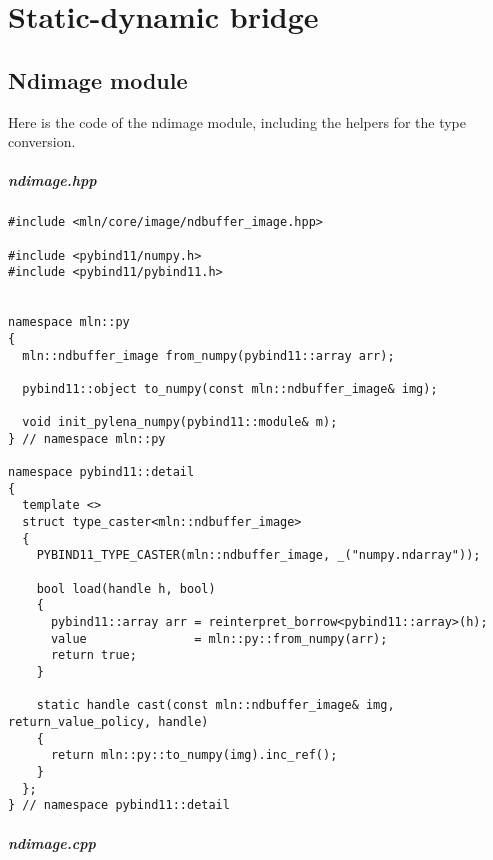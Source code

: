 \chapter{Static-dynamic bridge}
\label{appendix:static-dynamic-bridge}


\section{Ndimage module}
\label{appendix:static-dynamic-bridge.ndimage}

Here is the code of the ndimage module, including the helpers for the type conversion.

\paragraph{ndimage.hpp}

\begin{verbatim}
#include <mln/core/image/ndbuffer_image.hpp>

#include <pybind11/numpy.h>
#include <pybind11/pybind11.h>


namespace mln::py
{
  mln::ndbuffer_image from_numpy(pybind11::array arr);

  pybind11::object to_numpy(const mln::ndbuffer_image& img);

  void init_pylena_numpy(pybind11::module& m);
} // namespace mln::py

namespace pybind11::detail
{
  template <>
  struct type_caster<mln::ndbuffer_image>
  {
    PYBIND11_TYPE_CASTER(mln::ndbuffer_image, _("numpy.ndarray"));

    bool load(handle h, bool)
    {
      pybind11::array arr = reinterpret_borrow<pybind11::array>(h);
      value               = mln::py::from_numpy(arr);
      return true;
    }

    static handle cast(const mln::ndbuffer_image& img, return_value_policy, handle)
    {
      return mln::py::to_numpy(img).inc_ref();
    }
  };
} // namespace pybind11::detail
\end{verbatim}

\paragraph{ndimage.cpp}

